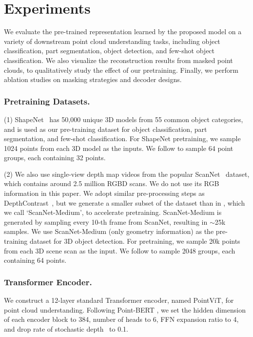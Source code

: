 \documentclass[runningheads]{llncs}
\begin{document}
 \section{Experiments}

We evaluate the pre-trained representation learned by the proposed model on a variety of downstream point cloud understanding tasks, including object classification, part segmentation, object detection, and few-shot object classification.  We also visualize the reconstruction results from masked point clouds, to qualitatively study the effect of our pretraining.  Finally, we perform ablation studies on masking strategies and decoder designs.

\vspace{-10pt}
\subsubsection{Pretraining Datasets.} \label{sec:datasets}
(1) ShapeNet~\cite{chang2015shapenet} has 50,000 unique 3D models from 55 common object categories, and is used as our pre-training dataset for object classification, part segmentation, and few-shot classification.  For ShapeNet pretraining, we sample 1024 points from each 3D model as the inputs.  We follow \cite{yu2021point} to sample 64 point groups, each containing 32 points.

(2) We also use single-view depth map videos from the popular ScanNet~\cite{dai2017scannet} dataset, which contains around 2.5 million RGBD scans.  We do not use its RGB information in this paper.
We adopt similar pre-processing steps as DepthContrast~\cite{Zhang_2021_ICCV}, but we generate a smaller subset of the dataset than in \cite{Zhang_2021_ICCV}, which we call `ScanNet-Medium', to accelerate pretraining.  ScanNet-Medium is generated by sampling every 10-th frame from ScanNet, resulting in $\sim$25k samples. We use ScanNet-Medium (only geometry information) as the pre-training dataset for 3D object detection.  For pretraining, we sample 20k points from each 3D scene scan as the input.  We follow \cite{misra2021-3detr} to sample 2048 groups, each containing 64 points.

\vspace{-10pt}
\subsubsection{Transformer Encoder.}  We construct a 12-layer standard Transformer encoder, named PointViT, for point cloud understanding.  Following Point-BERT \cite{yu2021point}, we set the hidden dimension of each encoder block to 384, number of heads to 6, FFN expansion ratio to 4, and drop rate of stochastic depth~\cite{huang2016deep} to 0.1.
\end{document}
